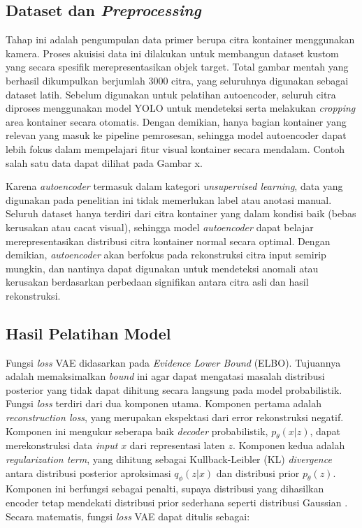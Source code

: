 \subsection{Dataset dan \textit{Preprocessing}}
Tahap ini adalah pengumpulan data primer berupa
citra kontainer menggunakan kamera. Proses akuisisi data ini
dilakukan untuk membangun dataset kustom yang secara spesifik
merepresentasikan objek target. Total gambar mentah yang berhasil
dikumpulkan berjumlah 3000 citra, yang seluruhnya digunakan sebagai
dataset latih. Sebelum digunakan untuk pelatihan autoencoder, seluruh
citra diproses menggunakan model YOLO untuk mendeteksi serta
melakukan \textit{cropping} area kontainer
secara otomatis. Dengan demikian, hanya bagian kontainer yang relevan
yang masuk ke pipeline pemrosesan, sehingga model autoencoder dapat
lebih fokus dalam mempelajari fitur visual kontainer secara mendalam.
Contoh salah satu data dapat dilihat pada Gambar x.

Karena \textit{autoencoder} termasuk dalam kategori \textit{unsupervised
learning}, data yang digunakan pada penelitian ini tidak memerlukan
label atau anotasi manual. Seluruh dataset hanya terdiri dari citra
kontainer yang dalam kondisi baik (bebas kerusakan atau cacat
visual), sehingga model \textit{autoencoder} dapat belajar merepresentasikan
distribusi citra kontainer normal secara optimal. Dengan demikian,
\textit{autoencoder} akan berfokus pada rekonstruksi citra input semirip
mungkin, dan nantinya dapat digunakan untuk mendeteksi anomali atau
kerusakan berdasarkan perbedaan signifikan antara citra asli dan
hasil rekonstruksi.

\vspace{1em}

\subsection{Hasil Pelatihan Model}

Fungsi \textit{loss} VAE didasarkan pada \textit{Evidence Lower
Bound} (ELBO). Tujuannya
adalah memaksimalkan \textit{bound} ini agar dapat mengatasi masalah
distribusi posterior yang tidak dapat dihitung secara langsung pada
model probabilistik. Fungsi \textit{loss} terdiri dari dua komponen utama.
Komponen pertama adalah \textit{reconstruction loss}, yang merupakan
ekspektasi dari error rekonstruksi negatif. Komponen ini mengukur
seberapa baik \textit{decoder} probabilistik, $p_\theta(x|z)$, dapat
merekonstruksi data \textit{input} $x$ dari representasi laten $z$. Komponen
kedua adalah \textit{regularization term}, yang dihitung sebagai
Kullback-Leibler (KL) \textit{divergence} antara distribusi posterior
aproksimasi $q_\phi(z|x)$ dan distribusi prior $p_\theta(z)$.
Komponen ini berfungsi sebagai penalti, supaya distribusi yang
dihasilkan encoder tetap mendekati distribusi prior sederhana
seperti distribusi Gaussian \citep{26}. Secara matematis, fungsi \textit{loss}
VAE dapat ditulis sebagai:

